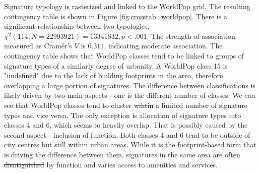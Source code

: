 \documentclass[fleqn,10pt]{wlscirep}
\providecommand{\DIFadd}[1]{{\protect\color{blue}\uwave{#1}}} %
\providecommand{\DIFdel}[1]{{\protect\color{red}\sout{#1}}}                      %
\providecommand{\DIFaddbegin}{} %
\providecommand{\DIFaddend}{} %
\providecommand{\DIFdelbegin}{} %
\providecommand{\DIFdelend}{} %
\begin{document}
Signature typology is rasterized and linked to the WorldPop grid. The resulting
contingency table is shown in Figure \ref{fig:crosstab_worldpop}. There is a significant relationship between
two typologies, $\chi^{2} (114, N = 22993921) = 13341832, p < .001$. The strength of
association measured as Cram\'{e}r's $V$ is $0.311$, indicating moderate association.
The contingency table shows that WorldPop classes tend to be linked to groups of
signature types of a similarly degree of urbanity. A WorldPop class 15 is "undefined" due
to the lack of building footprints in the area, therefore overlapping a large portion of
signatures.
The difference between classifications is likely driven by two main aspects - one is the different
number of classes. We can see that WorldPop classes tend to cluster \DIFdelbegin \DIFdel{wihtin }\DIFdelend \DIFaddbegin \DIFadd{within }\DIFaddend a limited number of
signature types and vice versa. The only exception is allocation of signature types into classes 4 and 6,
which seems to heavily overlap. That is possibly caused by the second aspect - inclusion of function. Both
classes 4 and 6 tend to be outside of city centres but still within urban areas. While it is
the footprint-based form that is driving the difference between them, signatures in the same
area are often \DIFdelbegin \DIFdel{disntiguished }\DIFdelend \DIFaddbegin \DIFadd{distinguished }\DIFaddend by function and varies access to amenities and services.
\end{document}
